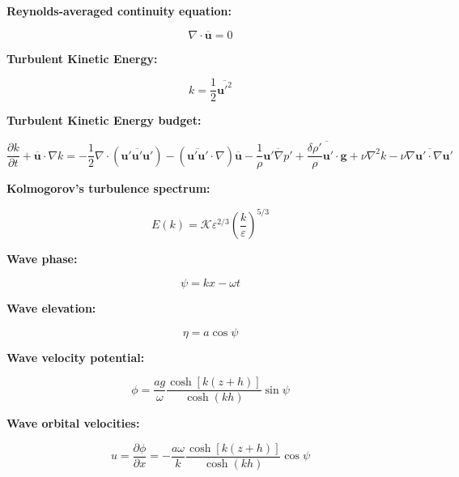 \documentclass[12pt]{article}
\numberwithin{equation}{section}
\numberwithin{figure}{section}
\numberwithin{table}{section}
\begin{document}
\textbf{Reynolds-averaged continuity equation:}

\begin{equation}
  \nabla \cdot \overline{\mathbf{u}} = 0
\end{equation}

\textbf{Turbulent Kinetic Energy:}

\begin{equation}
  k = \frac{1}{2} \overline{\mathbf{u}'^2}
\end{equation}

\textbf{Turbulent Kinetic Energy budget:}

\begin{equation}
  \frac{\partial k}{\partial t} + \overline{\mathbf{u}} \cdot \nabla k =
  - \frac{1}{2} \nabla \cdot (\overline{\mathbf{u}' \mathbf{u}' \mathbf{u}'})
  - (\overline{\mathbf{u}' \mathbf{u}'} \cdot \nabla) \overline{\mathbf{u}}
  - \frac{1}{\rho} \overline{\mathbf{u}' \nabla p'}
  + \overline{\frac{\delta \rho'}{\rho} \mathbf{u}' \cdot \mathbf{g}}
  + \nu \nabla^2 k
  - \nu \overline{\nabla \mathbf{u}' \cdot \nabla \mathbf{u}'}
\end{equation}

\textbf{Kolmogorov's turbulence spectrum:}

\begin{equation}
  E(k) = \mathcal{K} \varepsilon^{2/3} \left( \frac{k}{\varepsilon} \right)^{5/3}
\end{equation}

\textbf{Wave phase:}

\begin{equation}
  \psi = kx - \omega t
\end{equation}

\textbf{Wave elevation:}

\begin{equation}
  \eta = a \cos\psi
\end{equation}

\textbf{Wave velocity potential:}

\begin{equation}
  \phi = \frac{a g}{\omega} \frac{\cosh[k(z + h)]}{\cosh(kh)} \sin\psi
\end{equation}

\textbf{Wave orbital velocities:}

\begin{equation}
  u = \frac{\partial \phi}{\partial x} = - \frac{a \omega}{k} \frac{\cosh[k(z + h)]}{\cosh(kh)} \cos\psi
\end{equation}
\end{document}
